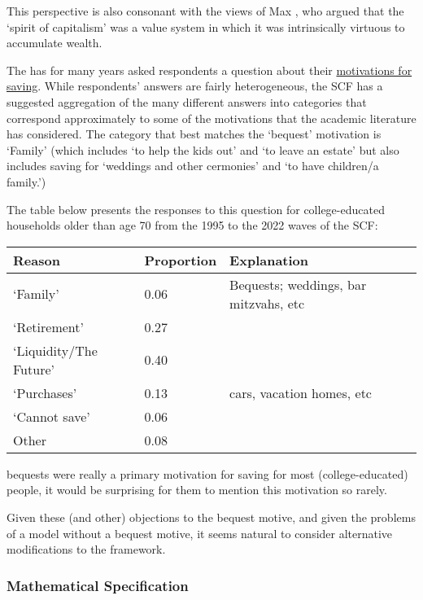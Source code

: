 \documentclass{article}
\begin{document}
This perspective is also consonant with the views of Max \cite{weberCapitalism}, who argued that the `spirit of capitalism' was a value system in which it was intrinsically virtuous to accumulate wealth.


The \cite{2023} has for many years asked respondents a question about their \href{https://www.federalreserve.gov/econres/files/bulletin.macro.txt}{motivations for saving}. While respondents' answers are fairly heterogeneous, the SCF has a suggested aggregation of the many different answers into categories that correspond approximately to some of the motivations that the academic literature has considered.  The category that best matches the `bequest' motivation is `Family' (which includes `to help the kids out' and `to leave an estate' but also includes saving for `weddings and other cermonies' and  `to have children/a family.')

The table below presents the responses to this question for college-educated households older than age 70 from the 1995 to the 2022 waves of the SCF:

\bigskip\noindent
\begin{tabular}{p{}p{}p{}}
\toprule
Reason & Proportion & Explanation \\
\hline
`Family' & 0.06 & Bequests; weddings, bar mitzvahs, etc \\
`Retirement' & 0.27 &  \\
`Liquidity/The Future' & 0.40 &  \\
`Purchases' & 0.13 & cars, vacation homes, etc \\
`Cannot save' & 0.06 &  \\
Other & 0.08 &  \\
\bottomrule
\end{tabular}

\bigskipIf bequests were really a primary motivation for saving for most (college-educated) people, it would be surprising for them to mention this motivation so rarely.

Given these (and other) objections to the bequest motive, and given the problems of a model without a bequest motive, it seems natural to consider alternative modifications to the framework.

\subsubsection{Mathematical Specification}
\end{document}

